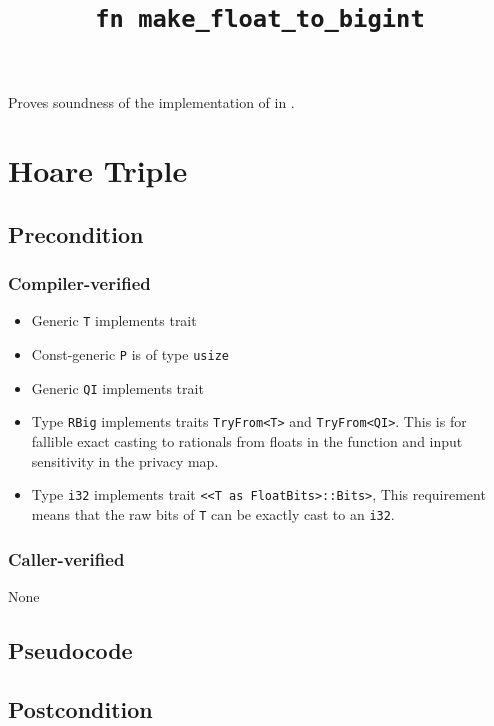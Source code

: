 \documentclass{article}
\title{\texttt{fn make\_float\_to\_bigint}}
\author{\MichaelShoemateAuthor}
\date{}
\begin{document}
\maketitle

\contrib
Proves soundness of the implementation of  in .

\section{Hoare Triple}
\subsection*{Precondition}
\subsubsection*{Compiler-verified}

\begin{itemize}
    \item Generic \texttt{T} implements trait 
    \item Const-generic \texttt{P} is of type \texttt{usize}
    \item Generic \texttt{QI} implements trait 
    \item Type \texttt{RBig} implements traits \texttt{TryFrom<T>} and \texttt{TryFrom<QI>}.
        This is for fallible exact casting to rationals from floats in the function and input sensitivity in the privacy map.
    \item Type \texttt{i32} implements trait \texttt{<<T as FloatBits>::Bits>},
        This requirement means that the raw bits of \texttt{T} can be exactly cast to an \texttt{i32}.
\end{itemize}

\subsubsection*{Caller-verified}
None

\subsection*{Pseudocode}


\subsection*{Postcondition}
\begin{theorem}
\end{theorem}
\end{document}
